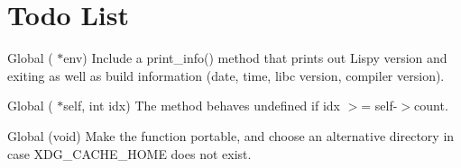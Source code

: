 \chapter{Todo List}
\hypertarget{todo}{}\label{todo}

\begin{DoxyRefList}
\item[Global \doxylink{main_8c_ab4bcf6908817f7fb2303080122c2c5e0}{cli\+\_\+interpreter} (\doxylink{structlenv__t}{lenv\+\_\+t} \texorpdfstring{$\ast$}{*}env)]\label{todo__todo000002}%
%
Include a print\+\_\+info() method that prints out Lispy version and exiting as well as build information (date, time, libc version, compiler version). 
\item[Global \doxylink{common_8h_a060fb30807a10066bf94bdfc35e9c252}{lval\+\_\+pop} (\doxylink{structlval__t}{lval\+\_\+t} \texorpdfstring{$\ast$}{*}self, int idx)]\label{todo__todo000001}%
%
The method behaves undefined if idx \texorpdfstring{$>$}{>}= self-\/\texorpdfstring{$>$}{>}count. 
\item[Global \doxylink{main_8c_aadcdb38d3064679ab74180a4629d969c}{prepare\+\_\+logfile} (void)]\label{todo__todo000003}%
%
Make the function portable, and choose an alternative directory in case XDG\+\_\+\+CACHE\+\_\+\+HOME does not exist.
\end{DoxyRefList}